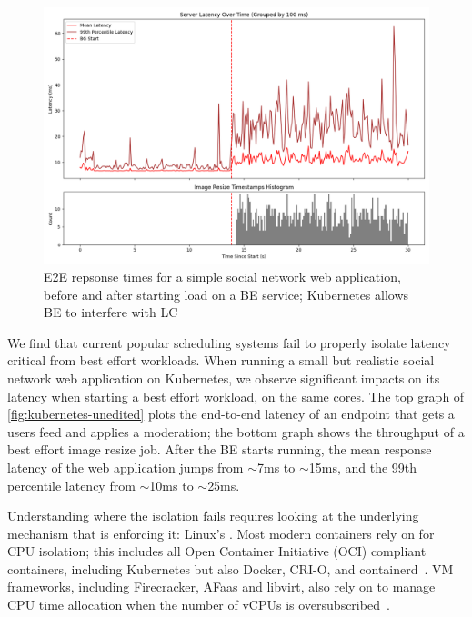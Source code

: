 \begin{figure}[t]
    \centering
    \includegraphics[width=\columnwidth]{graphs/kubernetes-unedited.png}
    \caption{E2E repsonse times for a simple social network web application,
    before and after starting load on a BE service; Kubernetes allows BE to
    interfere with LC}\label{fig:kubernetes-unedited}
\end{figure}

We find that current popular scheduling systems fail to properly isolate latency
critical from best effort workloads. When running a small but realistic social
network web application on Kubernetes, we observe significant impacts on its
latency when starting a best effort workload, on the same cores. The top graph
of \autoref{fig:kubernetes-unedited} plots the end-to-end latency of an endpoint
that gets a users feed and applies a moderation; the bottom graph shows the
throughput of a best effort image resize job. After the BE starts running, the
mean response latency of the web application jumps from $\sim$7ms to $\sim$15ms,
and the 99th percentile latency from $\sim$10ms to $\sim$25ms. 

Understanding where the isolation fails requires looking at the underlying
mechanism that is enforcing it: Linux's \cgroups{}. Most modern containers rely
on \cgroups{} for CPU isolation; this includes all Open Container Initiative
(OCI) compliant containers, including Kubernetes but also Docker, CRI-O, and
containerd~\cite{oci-cgroups,docker-docs-cgroups,container-isolation-article}.
VM frameworks, including Firecracker, AFaas and libvirt, also rely on \cgroups{}
to manage CPU time allocation when the number of vCPUs is
oversubscribed~\cite{firecracker-cgroups,afaas,libvirt-cgroups}.


